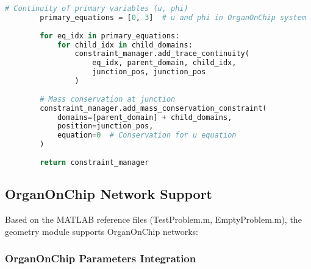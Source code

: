 \begin{lstlisting}[language=Python, caption=Junction Constraint Integration]
        # Continuity of primary variables (u, phi)
        primary_equations = [0, 3]  # u and phi in OrganOnChip system
        
        for eq_idx in primary_equations:
            for child_idx in child_domains:
                constraint_manager.add_trace_continuity(
                    eq_idx, parent_domain, child_idx,
                    junction_pos, junction_pos
                )
        
        # Mass conservation at junction
        constraint_manager.add_mass_conservation_constraint(
            domains=[parent_domain] + child_domains,
            position=junction_pos,
            equation=0  # Conservation for u equation
        )
        
        return constraint_manager
\end{lstlisting}

\subsection{OrganOnChip Network Support}
\label{subsec:ooc_network}

Based on the MATLAB reference files (TestProblem.m, EmptyProblem.m), the geometry module supports OrganOnChip networks:

\subsubsection{OrganOnChip Parameters Integration}

